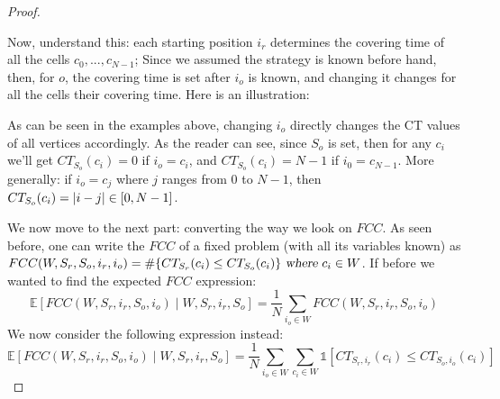 \documentclass[letterpaper, 10 pt, conference]{ieeeconf}  %
\newcommand\rob{\ensuremath{r}\xspace}
\newcommand\opp{\ensuremath{o}\xspace}
\newcommand{\fcc}{\ensuremath{FCC}\xspace}
\DeclarePairedDelimiter\abs{\lvert}{\rvert}%
\begin{document}
\begin{proof}
\begin{figure}[tb]
{

}
\end{figure}


Now, understand this: each starting position $i_r$ determines the covering time of all the cells $c_0,...,c_{N-1}$; Since we assumed the strategy is known before hand, then, for \opp,  the covering time is set after $i_\opp$ is known, and changing it changes for all the cells their covering time. Here is an illustration:


As can be seen in the examples above, changing $i_\opp$ directly changes the CT values of all vertices accordingly.
As the reader can see, since $S_{\opp}$ is set, then for any $c_i$ we'll get $CT_{S_{\opp}}(c_i)=0$ if $i_\opp=c_i$, and $CT_{S_{\opp}}(c_i)=N-1$ if $i_0=c_{N-1}$. More generally: if $i_\opp=c_j$ where $j$ ranges from $0$ to $N-1$, then $CT_{S_{\opp}}(c_i)=\abs{i-j}\in [0,N-1]$.

We now move to the next part: converting the way we look on \fcc. As seen before, one can write the \fcc of a fixed problem (with all its variables known) as $\fcc(W,S_{\rob},S_{\opp},i_r,i_\opp)=\# \lbrace CT_{S_{\rob}}(c_i) \le CT_{S_{\opp}}(c_i)\rbrace \textsl{ where } c_i\in W$.
If before we wanted to find the expected \fcc expression: 
\begin{dmath*}
\mathbb{E}\left[\fcc\left(W, S_{\rob}, i_r, S_{\opp}, i_\opp\right) \mid W, S_{\rob}, i_r, S_{\opp}\right]=
\frac{1}{N}\sum_{i_\opp\in W}{\fcc\left(W,S_{\rob},i_r,S_{\opp},i_\opp\right)}
\end{dmath*}
We now consider the following expression instead:
\begin{dmath*}
\mathbb{E}\left[\fcc\left(W, S_{\rob}, i_r, S_{\opp}, i_\opp\right) \mid W, S_{\rob}, i_r, S_{\opp}\right]=
\frac{1}{N}\sum_{i_\opp\in W}{\sum_{c_i\in W}{\mathds{1}\left[CT_{S_{\rob},i_r}(c_i) \le CT_{S_{\opp},i_\opp}(c_i)\right]}}
\end{dmath*}


\end{proof}
\end{document}
